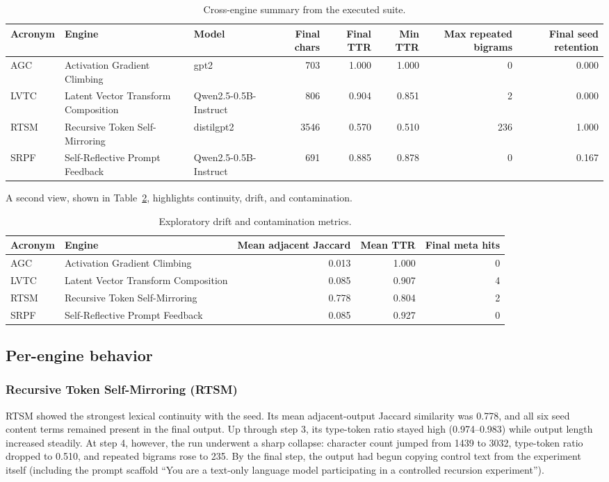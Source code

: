 \documentclass[11pt]{article}
\begin{document}
\begin{table}[ht]
\centering
\caption{Cross-engine summary from the executed suite.}
\label{tab:summary}
\begin{tabularx}{\textwidth}{@{}lXlrrrrr@{}}
\toprule
Acronym & Engine & Model & Final chars & Final TTR & Min TTR & Max repeated bigrams & Final seed retention \\
\midrule
AGC & Activation Gradient Climbing & gpt2 & 703 & 1.000 & 1.000 & 0 & 0.000 \\
LVTC & Latent Vector Transform Composition & Qwen2.5-0.5B-Instruct & 806 & 0.904 & 0.851 & 2 & 0.000 \\
RTSM & Recursive Token Self-Mirroring & distilgpt2 & 3546 & 0.570 & 0.510 & 236 & 1.000 \\
SRPF & Self-Reflective Prompt Feedback & Qwen2.5-0.5B-Instruct & 691 & 0.885 & 0.878 & 0 & 0.167 \\
\bottomrule
\end{tabularx}
\end{table}

A second view, shown in Table~\ref{tab:drift}, highlights continuity, drift, and contamination.

\begin{table}[ht]
\centering
\caption{Exploratory drift and contamination metrics.}
\label{tab:drift}
\begin{tabularx}{\textwidth}{@{}lXrrr@{}}
\toprule
Acronym & Engine & Mean adjacent Jaccard & Mean TTR & Final meta hits \\
\midrule
AGC & Activation Gradient Climbing & 0.013 & 1.000 & 0 \\
LVTC & Latent Vector Transform Composition & 0.085 & 0.907 & 4 \\
RTSM & Recursive Token Self-Mirroring & 0.778 & 0.804 & 2 \\
SRPF & Self-Reflective Prompt Feedback & 0.085 & 0.927 & 0 \\
\bottomrule
\end{tabularx}
\end{table}

\subsection{Per-engine behavior}

\subsubsection{Recursive Token Self-Mirroring (RTSM)}
RTSM showed the strongest lexical continuity with the seed. Its mean adjacent-output Jaccard similarity was 0.778, and all six seed content terms remained present in the final output. Up through step 3, its type-token ratio stayed high (0.974--0.983) while output length increased steadily. At step 4, however, the run underwent a sharp collapse: character count jumped from 1439 to 3032, type-token ratio dropped to 0.510, and repeated bigrams rose to 235. By the final step, the output had begun copying control text from the experiment itself (including the prompt scaffold ``You are a text-only language model participating in a controlled recursion experiment'').
\end{document}
